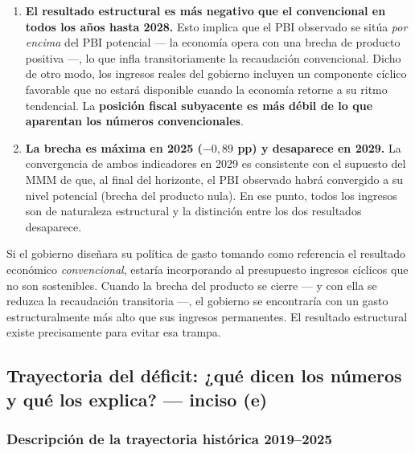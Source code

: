 \documentclass[12pt, a4paper]{article}
\newcommand{\emp}[1]{\textbf{#1}}
\begin{document}
\begin{enumerate}[leftmargin=1.5em]

    \item \emp{El resultado estructural es más negativo que el convencional
    en todos los años hasta 2028.}
    Esto implica que el PBI observado se sitúa \emph{por encima} del PBI
    potencial --- la economía opera con una brecha de producto positiva ---,
    lo que infla transitoriamente la recaudación convencional. Dicho de otro
    modo, los ingresos reales del gobierno incluyen un componente cíclico
    favorable que no estará disponible cuando la economía retorne a su ritmo
    tendencial. La \emp{posición fiscal subyacente es más débil de lo que
    aparentan los números convencionales}.

    \item \emp{La brecha es máxima en 2025 ($-0{,}89$ pp) y desaparece en 2029.}
    La convergencia de ambos indicadores en 2029 es consistente con el supuesto
    del MMM de que, al final del horizonte, el PBI observado habrá convergido
    a su nivel potencial (brecha del producto nula). En ese punto, todos los
    ingresos son de naturaleza estructural y la distinción entre los dos
    resultados desaparece.

\end{enumerate}

\begin{tcolorbox}[title={Implicancia de política fiscal}]
Si el gobierno diseñara su política de gasto tomando como referencia el
resultado económico \emph{convencional}, estaría incorporando al presupuesto
ingresos cíclicos que no son sostenibles. Cuando la brecha del producto se
cierre --- y con ella se reduzca la recaudación transitoria ---, el gobierno
se encontraría con un gasto estructuralmente más alto que sus ingresos
permanentes. El resultado estructural existe precisamente para evitar esa
trampa.
\end{tcolorbox}

\subsection{Trayectoria del déficit: ¿qué dicen los números
            y qué los explica? --- inciso (e)}

\subsubsection*{Descripción de la trayectoria histórica 2019--2025}
\end{document}
